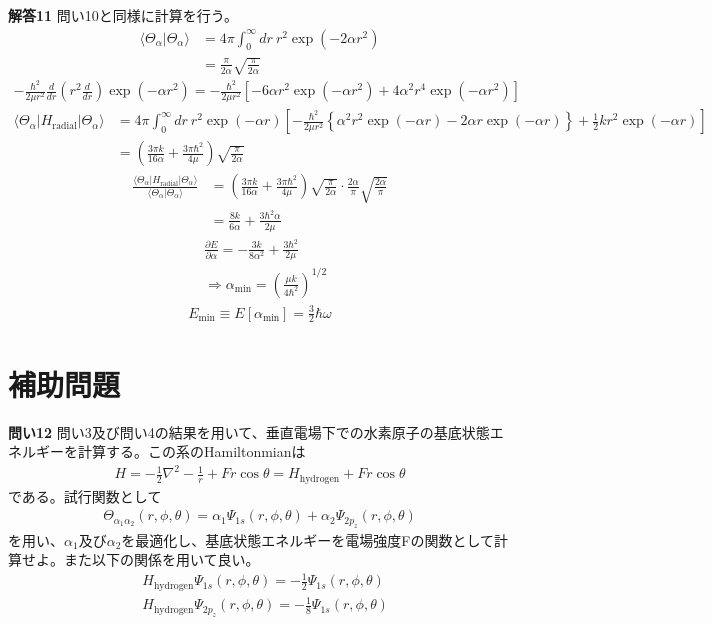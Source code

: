 \documentclass[11pt,pra,aps]{revtex4}
\begin{document}
\noindent
{\bf 解答11}
問い10と同様に計算を行う。
\begin{align}
  \langle\Theta_\alpha|\Theta_\alpha\rangle&=4\pi\int_0^\infty dr \ r^2\exp(-2\alpha r^2) \nonumber \\
  &=\frac{\pi}{2\alpha}\sqrt{\frac{\pi}{2\alpha}}
\end{align}
\begin{align}
  - \frac{\hbar^2}{2\mu r^2}\frac{d}{dr}\left(r^2\frac{d}{dr}\right)\exp(-\alpha r^2) = - \frac{\hbar^2}{2\mu r^2} \left[- 6 \alpha r^2 \exp(-\alpha r^2) + 4\alpha^2 r^4 \exp(-\alpha r^2)\right]
\end{align}
\begin{align}
  \langle\Theta_\alpha|H_\text{radial}|\Theta_\alpha\rangle&=4\pi\int_0^\infty dr \ r^2\exp(-\alpha r)\left[ - \frac{\hbar^2}{2\mu r^2} \left\{\alpha^2 r^2 \exp(-\alpha r) - 2\alpha r \exp(-\alpha r)\right\} + \frac{1}{2}kr^2\exp(-\alpha r)\right] \nonumber \\
  &=\left(\frac{3\pi k}{16\alpha}+\frac{3\pi\hbar^2}{4\mu}\right)\sqrt{\frac{\pi}{2\alpha}}
\end{align}
\begin{align}
  \frac{\langle\Theta_\alpha|H_\text{radial}|\Theta_\alpha\rangle}{\langle\Theta_\alpha|\Theta_\alpha\rangle} &= \left(\frac{3\pi k}{16\alpha}+\frac{3\pi\hbar^2}{4\mu}\right)\sqrt{\frac{\pi}{2\alpha}} \cdot \frac{2\alpha}{\pi}\sqrt{\frac{2\alpha}{\pi}} \nonumber \\
  &=\frac{8k}{6\alpha}+\frac{3\hbar^2 \alpha}{2\mu}
\end{align}
\begin{align}
  &\frac{\partial E}{\partial\alpha} = - \frac{3k}{8\alpha^2}+\frac{3\hbar^2}{2\mu} \\
  &\Rightarrow \alpha_\text{min} = \left( \frac{\mu k}{4\hbar^2} \right)^{1/2}
\end{align}
\begin{align}
  E_\text{min}\equiv E[\alpha_\text{min}] = \frac{3}{2}\hbar\omega
\end{align}

\section{補助問題}

\noindent
{\bf 問い12} 問い3及び問い4の結果を用いて、垂直電場下での水素原子の基底状態エネルギーを計算する。この系のHamiltonmianは
\begin{align}
  H=-\frac{1}{2}\nabla^2-\frac{1}{r}+Fr\cos\theta=H_\text{hydrogen}+Fr\cos\theta
\end{align}
である。試行関数として
\begin{align}
  \Theta_{\alpha_1\alpha_2}(r,\phi,\theta)=\alpha_1\Psi_{1s}(r,\phi,\theta)+\alpha_2\Psi_{2p_z}(r,\phi,\theta)
\end{align}
を用い、$\alpha_1$及び$\alpha_2$を最適化し、基底状態エネルギーを電場強度Fの関数として計算せよ。また以下の関係を用いて良い。
\begin{align}
  &H_\text{hydrogen}\Psi_{1s}(r,\phi,\theta)=-\frac{1}{2}\Psi_{1s}(r,\phi,\theta) \\
  &H_\text{hydrogen}\Psi_{2p_z}(r,\phi,\theta)=-\frac{1}{8}\Psi_{1s}(r,\phi,\theta)
\end{align}
\end{document}
